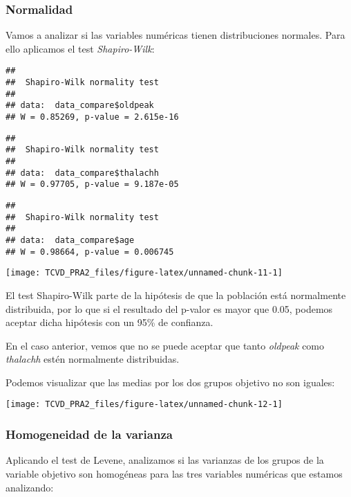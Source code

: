 \documentclass[
]{article}
\begin{document}
\hypertarget{normalidad}{%
\subsubsection{Normalidad}\label{normalidad}}

Vamos a analizar si las variables numéricas tienen distribuciones
normales. Para ello aplicamos el test \emph{Shapiro-Wilk}:

\begin{verbatim}
## 
##  Shapiro-Wilk normality test
## 
## data:  data_compare$oldpeak
## W = 0.85269, p-value = 2.615e-16
\end{verbatim}

\begin{verbatim}
## 
##  Shapiro-Wilk normality test
## 
## data:  data_compare$thalachh
## W = 0.97705, p-value = 9.187e-05
\end{verbatim}

\begin{verbatim}
## 
##  Shapiro-Wilk normality test
## 
## data:  data_compare$age
## W = 0.98664, p-value = 0.006745
\end{verbatim}

\begin{center}\texttt{[image: TCVD\_PRA2\_files/figure-latex/unnamed-chunk-11-1]} \end{center}

El test Shapiro-Wilk parte de la hipótesis de que la población está
normalmente distribuida, por lo que si el resultado del p-valor es mayor
que 0.05, podemos aceptar dicha hipótesis con un 95\% de confianza.

En el caso anterior, vemos que no se puede aceptar que tanto
\emph{oldpeak} como \emph{thalachh} estén normalmente distribuidas.

Podemos visualizar que las medias por los dos grupos objetivo no son
iguales:

\begin{center}\texttt{[image: TCVD\_PRA2\_files/figure-latex/unnamed-chunk-12-1]} \end{center}

\hypertarget{homogeneidad-de-la-varianza}{%
\subsubsection{Homogeneidad de la
varianza}\label{homogeneidad-de-la-varianza}}

Aplicando el test de Levene, analizamos si las varianzas de los grupos
de la variable objetivo son homogéneas para las tres variables numéricas
que estamos analizando:
\end{document}
